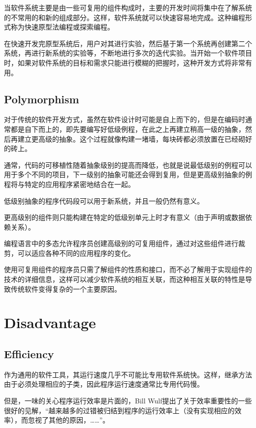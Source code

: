 当软件系统主要是由一些可复用的组件构成时，主要的开发时间将集中在了解系统的不常用的和新的组成部分。这样，软件系统就可以快速容易地完成。这种编程形式称为快速原型法编程或探索编程。

在快速开发完原型系统后，用户对其进行实验，然后基于第一个系统再创建第二个系统，再进行新系统的实验等，不断地进行多次的迭代实验。当开始一个软件项目时，如果对软件系统的目标和需求只能进行模糊的把握时，这种开发方式将非常有用。


\section{Polymorphism}

对于传统的软件开发方式，虽然在软件设计时可能是自上而下的，但是在编码时通常都是自下而上的，即先要编写好低级例程，在此之上再建立稍高一级的抽象，然后再建立更高级的抽象。这个过程就像构建一堵墙，每块砖都必须放置在已经砌好的砖上。

通常，代码的可移植性随着抽象级别的提高而降低，也就是说最低级别的例程可以用于多个不同的项目，下一级别的抽象可能还会得到复用，但是更高级别抽象的例程将与特定的应用程序紧密地结合在一起。

\begin{compactitem}
\item 低级别抽象的程序代码段可以用于新系统，并且一般仍然有意义。
\item 更高级别的组件则只能构建在特定的低级别单元上时才有意义（由于声明或数据依赖关系）。
\end{compactitem}

编程语言中的多态允许程序员创建高级别的可复用组件，通过对这些组件进行裁剪，可以适应各种不同的应用程序的变化。

使用可复用组件的程序员只需了解组件的性质和接口，而不必了解用于实现组件的技术的详细信息，这样可以减少软件系统的相互关联，而这种相互关联的特性是导致传统软件变得复杂的一个主要原因。


\chapter{Disadvantage}

\section{Efficiency}

作为通用的软件工具，其运行速度几乎不可能比专用软件系统快。这样，继承方法由于必须处理相应的子类，因此程序运行速度通常比专用代码慢。

但是，一味的关心程序运行效率是片面的，Bill Wulf提出了关于效率重要性的一些很好的见解，“越来越多的过错被归结到程序的运行效率上（没有实现相应的效率），而忽视了其他的原因，……”。

